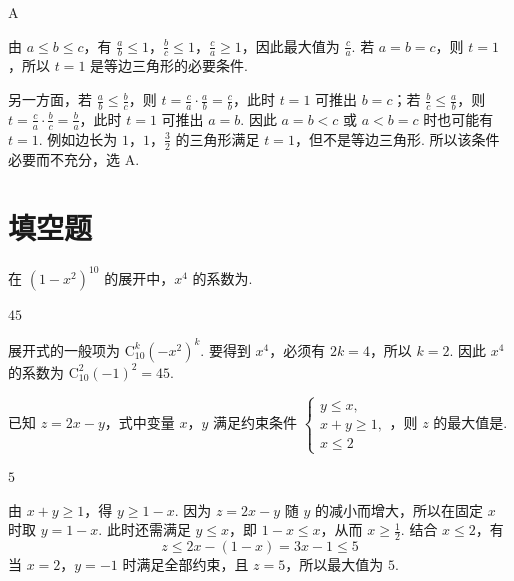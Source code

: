 \begin{answer}
A
\end{answer}

\begin{solution}
由 \(a\leqslant b\leqslant c\)，有 \(\frac{a}{b}\leqslant1\)，\(\frac{b}{c}\leqslant1\)，\(\frac{c}{a}\geqslant1\)，因此最大值为 \(\frac{c}{a}\). 若 \(a=b=c\)，则 \(t=1\)，所以 \(t=1\) 是等边三角形的必要条件.

另一方面，若 \(\frac{a}{b}\leqslant\frac{b}{c}\)，则 \(t=\frac{c}{a}\cdot\frac{a}{b}=\frac{c}{b}\)，此时 \(t=1\) 可推出 \(b=c\)；若 \(\frac{b}{c}\leqslant\frac{a}{b}\)，则 \(t=\frac{c}{a}\cdot\frac{b}{c}=\frac{b}{a}\)，此时 \(t=1\) 可推出 \(a=b\). 因此 \(a=b<c\) 或 \(a<b=c\) 时也可能有 \(t=1\). 例如边长为 \(1\)，\(1\)，\(\frac{3}{2}\) 的三角形满足 \(t=1\)，但不是等边三角形. 所以该条件必要而不充分，选 A.
\end{solution}

\section{填空题}

\begin{problem}
在 \((1 - x^{2})^{10}\) 的展开中，\(x^{4}\) 的系数为\fillinblank{}.
\end{problem}

\begin{answer}
\(45\)
\end{answer}

\begin{solution}
展开式的一般项为 \(\mathrm C_{10}^{k}(-x^2)^k\). 要得到 \(x^4\)，必须有 \(2k=4\)，所以 \(k=2\). 因此 \(x^4\) 的系数为 \(\mathrm C_{10}^{2}(-1)^2=45\).
\end{solution}

\begin{problem}
已知 \(z = 2x - y\)，式中变量 \(x\)，\(y\) 满足约束条件 \(\begin{cases}
y \leqslant x,\\
x + y \geqslant 1,\\
x \leqslant 2
\end{cases}\)，则 \(z\) 的最大值是\fillinblank{}.
\end{problem}

\begin{answer}
\(5\)
\end{answer}

\begin{solution}
由 \(x+y\geqslant1\)，得 \(y\geqslant1-x\). 因为 \(z=2x-y\) 随 \(y\) 的减小而增大，所以在固定 \(x\) 时取 \(y=1-x\). 此时还需满足 \(y\leqslant x\)，即 \(1-x\leqslant x\)，从而 \(x\geqslant\frac12\). 结合 \(x\leqslant2\)，有
\[
z\leqslant2x-(1-x)=3x-1\leqslant5
\]
当 \(x=2\)，\(y=-1\) 时满足全部约束，且 \(z=5\)，所以最大值为 \(5\).
\end{solution}

